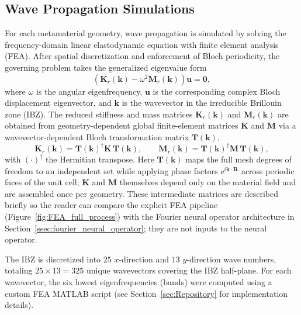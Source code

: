 \documentclass[preprint,review,12pt,numafflabel]{elsarticle}
\begin{document}
\subsection{Wave Propagation Simulations} 
\label{ssec:wave_propagration_simulations}

For each metamaterial geometry, wave propagation is simulated by solving the frequency-domain linear elastodynamic equation with finite element analysis (FEA). After spatial discretization and enforcement of Bloch periodicity, the governing problem takes the generalized eigenvalue form
\begin{equation}
\label{eqn:eig_PDE}
\left( \mathbf{K}_r(\mathbf{k}) - \omega^2 \mathbf{M}_r(\mathbf{k}) \right) \mathbf{u} = \mathbf{0},
\end{equation}
where $\omega$ is the angular eigenfrequency, $\mathbf{u}$ is the corresponding complex Bloch displacement eigenvector, and $\mathbf{k}$ is the wavevector in the irreducible Brillouin zone (IBZ). The reduced stiffness and mass matrices $\mathbf{K}_r(\mathbf{k})$ and $\mathbf{M}_r(\mathbf{k})$ are obtained from geometry-dependent global finite-element matrices $\mathbf{K}$ and $\mathbf{M}$ via a wavevector-dependent Bloch transformation matrix $\mathbf{T}(\mathbf{k})$,
\begin{equation}
\label{eqn:reduced_KM}
\mathbf{K}_r(\mathbf{k}) = \mathbf{T}(\mathbf{k})^{\dagger}\mathbf{K}\,\mathbf{T}(\mathbf{k}),
\qquad
\mathbf{M}_r(\mathbf{k}) = \mathbf{T}(\mathbf{k})^{\dagger}\mathbf{M}\,\mathbf{T}(\mathbf{k}),
\end{equation}
with $(\cdot)^{\dagger}$ the Hermitian transpose. Here $\mathbf{T}(\mathbf{k})$ maps the full mesh degrees of freedom to an independent set while applying phase factors $\mathrm{e}^{i\mathbf{k}\cdot\mathbf{R}}$ across periodic faces of the unit cell; $\mathbf{K}$ and $\mathbf{M}$ themselves depend only on the material field and are assembled once per geometry. These intermediate matrices are described briefly so the reader can compare the explicit FEA pipeline (Figure~\ref{fig:FEA_full_process}) with the Fourier neural operator architecture in Section~\ref{ssec:fourier_neural_operator}; they are not inputs to the neural operator.

The IBZ is discretized into $25$ $x$-direction and $13$ $y$-direction wave numbers, totaling $25 \times 13 = 325$ unique wavevectors covering the IBZ half-plane. For each wavevector, the six lowest eigenfrequencies (bands) were computed using a custom FEA MATLAB script (see Section~\ref{sec:Repository} for implementation details). 
\end{document}
